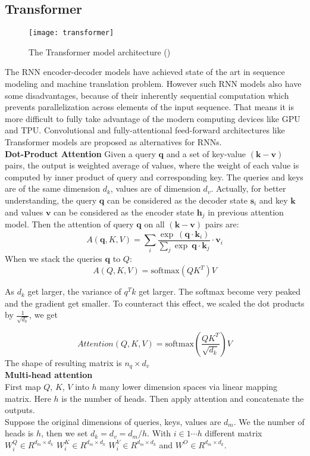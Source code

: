 \subsection{Transformer}
\begin{figure}[t]
	\texttt{[image: transformer]}
	\caption{The Transformer model architecture (\cite{vaswani2017attention})}
	\centering
\end{figure}
The RNN encoder-decoder models have achieved state of the art in sequence modeling and machine translation problem. However such RNN models also have some disadvantages, because of their inherently sequential computation which prevents parallelization across elements of the input sequence. That means it is more difficult to fully take advantage of the modern computing devices like GPU and TPU. Convolutional \cite{gehring2017convolutional} and fully-attentional feed-forward architectures like Transformer \cite{vaswani2017attention} models are proposed as alternatives for RNNs. \\

\textbf{Dot-Product Attention}
Given a query $\bm{q}$ and a set of key-value $(\bm{k}-\bm{v})$ pairs, the output is weighted average of values, where the weight of each value is computed by inner product of query and corresponding key. The queries and keys are of the same dimension ${d_k}$, values are of dimension ${d_v}$. Actually, for better understanding, the query $\bm{q}$  can be considered as the decoder state $\bm{s}_i$ and key $\bm{k}$ and values $\bm{v}$ can be considered as the encoder state $\bm{h}_j$ in previous attention model. Then the attention of query $\bm{q}$ on all $(\bm{k}-\bm{v})$ pairs are:
\[ A(\bm{q}, K, V) = \sum_{i}{ \frac{\exp\ ({\bm{q}\cdot \bm{k}_i})}{\sum_{j} \exp\ {\bm{q}\cdot \bm{k}_j} } \cdot \bm{v}_i}\]
When we stack the queries ${\bm{q}}$ to ${Q}$:
\[ A(Q, K, V) = \text{softmax}(QK^T)V\]

As ${d_k}$ get larger, the variance of ${q^T k}$ get larger.  The softmax become very peaked and the gradient get smaller. To counteract this effect, we scaled the dot products by ${\frac{1}{\sqrt{d_k}}}$, we get

\[ Attention(Q,K,V) = \text{softmax}(\frac{QK^T}{\sqrt{d_k}})V\]
The shape of resulting matrix is $n_q \times d_v$\\

\textbf{Multi-head attention}\\
 First map $Q$, $K$, $V$ into $h$ many lower dimension spaces via linear mapping matrix. Here $h$ is the number of heads. Then apply attention and concatenate the outputs. \\
Suppose the original dimensions of queries, keys, values are ${d_{m}}$. We the number of heads is ${h}$, then we set ${d_k = d_v = d_{m}/h}$. With ${i \in 1 \cdots h}$ different matrix ${W_i^Q \in R^{d_{m}\times d_k}}$ ${W_i^K \in R^{d_{m}\times d_k}}$ ${W_i^V \in R^{d_{m}\times d_k}}$ and ${W^O \in R^{d_{m}\times d_k}}$.


